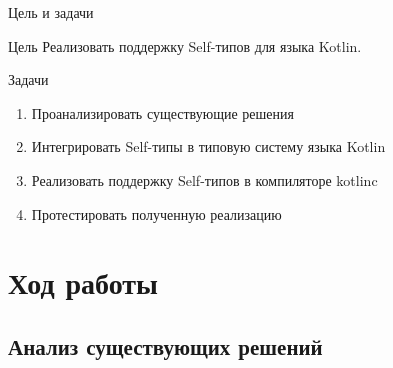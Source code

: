 \documentclass[handout,aspectratio=169,usenames,dvipsnames]{beamer}
\begin{document}
    \begin{frame}[fragile]{Цель и задачи}

        \begin{block}{Цель}
            Реализовать поддержку Self-типов для языка Kotlin.
        \end{block}

        \begin{block}{Задачи}
            \begin{enumerate}
                \item Проанализировать существующие решения
                \item Интегрировать Self-типы в типовую систему языка Kotlin
                \item Реализовать поддержку Self-типов в компиляторе kotlinc
                \item Протестировать полученную реализацию
            \end{enumerate}
        \end{block}
    \end{frame}


    \section{Ход работы}


    \subsection{Анализ существующих решений}
\end{document}
